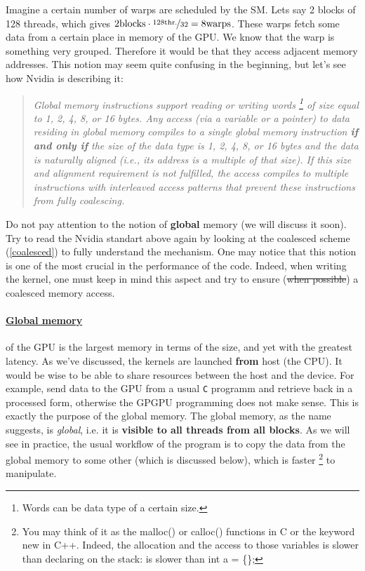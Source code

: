 Imagine a certain number of warps are scheduled by the SM. Lets say 2 blocks of 128 threads, which gives 
$2\text{blocks}\cdot\nicefrac{128\text{thr.}}{32} = 8 \text{warps}$. These warps fetch some data 
from a certain place in memory of the GPU. We know that the warp is something very grouped. 
Therefore it would be  that they access adjacent memory addresses. This notion 
may seem quite confusing in the beginning, but let's see how Nvidia is describing it\cite{center}:

\vspace{-10pt}
\begin{quote}
   \textsl{Global memory instructions support reading or writing words \footnote{Words can be data type of a certain size.} 
   of size equal to 1, 2, 4, 8, or 16 bytes. 
   Any access (via a variable or a pointer) to data residing in global memory compiles to a single global memory 
   instruction \textbf{if and only if} the size of the data type is 1, 2, 4, 8, or 16 bytes and the data is naturally aligned 
   (i.e., its address is a multiple of that size). If this size and alignment requirement is not fulfilled, the access 
   compiles to multiple instructions with interleaved access patterns that prevent these instructions from fully coalescing.}
\label{coalescedquote}
\end{quote}
Do not pay attention to the notion of \textbf{global} memory (we will discuss it soon).
Try to read the Nvidia standart above again by looking at the coalesced scheme (\autoref{coalesced})
to fully understand the mechanism. One may notice that this notion is one of the most crucial in the performance of the code.
Indeed, when writing the kernel, one must keep in mind this aspect and try to ensure (\sout{when possible}) 
a coalesced memory access.

\vspace{-15pt}
\paragraph{\underline{Global memory}} of the GPU is the largest memory in terms of the size, and yet with the greatest latency.
As we've discussed, the kernels are launched \textbf{from} host (the CPU). It would be wise to be able to share 
resources between the host and the device. For example, send data to the GPU from a usual \verb|C| programm
and retrieve back in a processed form, otherwise the GPGPU programming does not make sense. 
This is exactly the purpose of the global memory. The global memory, as the 
name suggests, is \textsl{global}, i.e. it is \textbf{visible to all threads from all blocks}. As we will see in practice,
the usual workflow of the program is to copy the data from the global memory to some other (which is discussed below), 
which is faster \footnote{You may think of it as the {\selectfont malloc()} or {\selectfont calloc()} functions in C
or the keyword {\selectfont new} in C++. Indeed, the allocation and the access to those variables is slower than 
declaring on the stack: is slower than {\selectfont int a = \{\};}}  
to manipulate. 

